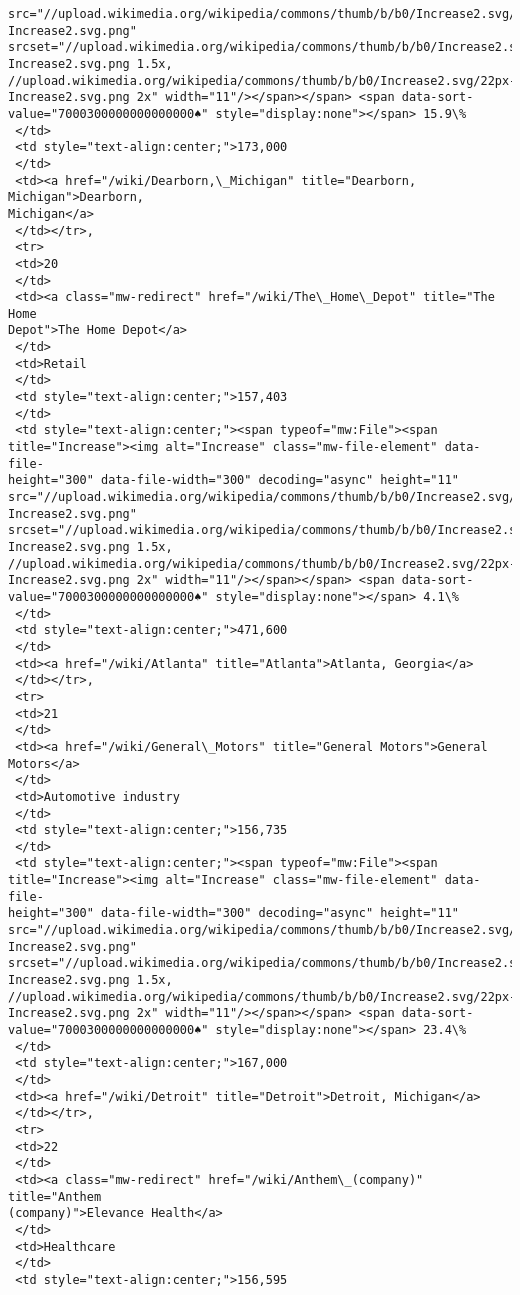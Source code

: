 \documentclass[11pt]{article}
\begin{document}
\begin{tcolorbox}[breakable, size=fbox, boxrule=.5pt, pad at break*=1mm, opacityfill=0]
\begin{Verbatim}[commandchars=\\\{\}]
src="//upload.wikimedia.org/wikipedia/commons/thumb/b/b0/Increase2.svg/11px-
Increase2.svg.png"
srcset="//upload.wikimedia.org/wikipedia/commons/thumb/b/b0/Increase2.svg/17px-
Increase2.svg.png 1.5x,
//upload.wikimedia.org/wikipedia/commons/thumb/b/b0/Increase2.svg/22px-
Increase2.svg.png 2x" width="11"/></span></span> <span data-sort-
value="7000300000000000000♠" style="display:none"></span> 15.9\%
 </td>
 <td style="text-align:center;">173,000
 </td>
 <td><a href="/wiki/Dearborn,\_Michigan" title="Dearborn, Michigan">Dearborn,
Michigan</a>
 </td></tr>,
 <tr>
 <td>20
 </td>
 <td><a class="mw-redirect" href="/wiki/The\_Home\_Depot" title="The Home
Depot">The Home Depot</a>
 </td>
 <td>Retail
 </td>
 <td style="text-align:center;">157,403
 </td>
 <td style="text-align:center;"><span typeof="mw:File"><span
title="Increase"><img alt="Increase" class="mw-file-element" data-file-
height="300" data-file-width="300" decoding="async" height="11"
src="//upload.wikimedia.org/wikipedia/commons/thumb/b/b0/Increase2.svg/11px-
Increase2.svg.png"
srcset="//upload.wikimedia.org/wikipedia/commons/thumb/b/b0/Increase2.svg/17px-
Increase2.svg.png 1.5x,
//upload.wikimedia.org/wikipedia/commons/thumb/b/b0/Increase2.svg/22px-
Increase2.svg.png 2x" width="11"/></span></span> <span data-sort-
value="7000300000000000000♠" style="display:none"></span> 4.1\%
 </td>
 <td style="text-align:center;">471,600
 </td>
 <td><a href="/wiki/Atlanta" title="Atlanta">Atlanta, Georgia</a>
 </td></tr>,
 <tr>
 <td>21
 </td>
 <td><a href="/wiki/General\_Motors" title="General Motors">General Motors</a>
 </td>
 <td>Automotive industry
 </td>
 <td style="text-align:center;">156,735
 </td>
 <td style="text-align:center;"><span typeof="mw:File"><span
title="Increase"><img alt="Increase" class="mw-file-element" data-file-
height="300" data-file-width="300" decoding="async" height="11"
src="//upload.wikimedia.org/wikipedia/commons/thumb/b/b0/Increase2.svg/11px-
Increase2.svg.png"
srcset="//upload.wikimedia.org/wikipedia/commons/thumb/b/b0/Increase2.svg/17px-
Increase2.svg.png 1.5x,
//upload.wikimedia.org/wikipedia/commons/thumb/b/b0/Increase2.svg/22px-
Increase2.svg.png 2x" width="11"/></span></span> <span data-sort-
value="7000300000000000000♠" style="display:none"></span> 23.4\%
 </td>
 <td style="text-align:center;">167,000
 </td>
 <td><a href="/wiki/Detroit" title="Detroit">Detroit, Michigan</a>
 </td></tr>,
 <tr>
 <td>22
 </td>
 <td><a class="mw-redirect" href="/wiki/Anthem\_(company)" title="Anthem
(company)">Elevance Health</a>
 </td>
 <td>Healthcare
 </td>
 <td style="text-align:center;">156,595

\end{Verbatim}
\end{tcolorbox}
\end{document}
